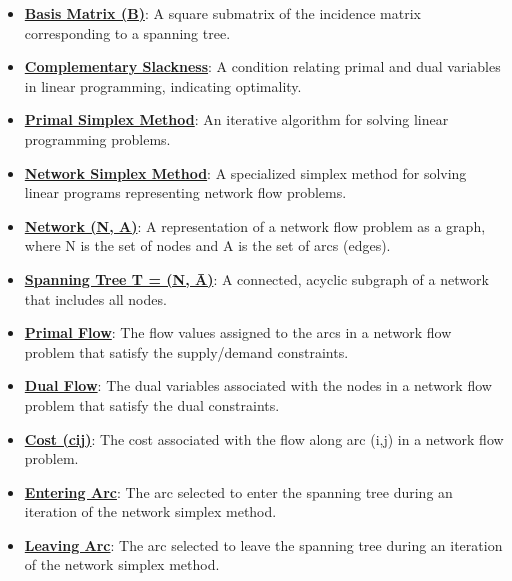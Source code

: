 \documentclass{article}%
\begin{document}
\begin{itemize}[leftmargin=*]
\item \href{https://www.math.purdue.edu/~yipn/421/2024-11-05-NetFlows.pdf#page=15}{\textbf{Basis Matrix (B)}}: A square submatrix of the incidence matrix corresponding to a spanning tree. %
\item \href{https://www.math.purdue.edu/~yipn/421/2024-11-05-NetFlows.pdf#page=18}{\textbf{Complementary Slackness}}: A condition relating primal and dual variables in linear programming, indicating optimality. %
\item \href{https://www.math.purdue.edu/~yipn/421/2024-11-05-NetFlows.pdf#page=22}{\textbf{Primal Simplex Method}}: An iterative algorithm for solving linear programming problems. %
\item \href{https://www.math.purdue.edu/~yipn/421/2024-11-07-NetSimplex.pdf#page=1}{\textbf{Network Simplex Method}}: A specialized simplex method for solving linear programs representing network flow problems. %
\item \href{https://www.math.purdue.edu/~yipn/421/2024-11-07-NetSimplex.pdf#page=1}{\textbf{Network (N, A)}}: A representation of a network flow problem as a graph, where N is the set of nodes and A is the set of arcs (edges). %
\item \href{https://www.math.purdue.edu/~yipn/421/2024-11-07-NetSimplex.pdf#page=1}{\textbf{Spanning Tree T = (N, Ā)}}: A connected, acyclic subgraph of a network that includes all nodes. %
\item \href{https://www.math.purdue.edu/~yipn/421/2024-11-07-NetSimplex.pdf#page=2}{\textbf{Primal Flow}}: The flow values assigned to the arcs in a network flow problem that satisfy the supply/demand constraints. %
\item \href{https://www.math.purdue.edu/~yipn/421/2024-11-07-NetSimplex.pdf#page=3}{\textbf{Dual Flow}}: The dual variables associated with the nodes in a network flow problem that satisfy the dual constraints. %
\item \href{https://www.math.purdue.edu/~yipn/421/2024-11-07-NetSimplex.pdf#page=3}{\textbf{Cost (cij)}}: The cost associated with the flow along arc (i,j) in a network flow problem. %
\item \href{https://www.math.purdue.edu/~yipn/421/2024-11-07-NetSimplex.pdf#page=6}{\textbf{Entering Arc}}: The arc selected to enter the spanning tree during an iteration of the network simplex method. %
\item \href{https://www.math.purdue.edu/~yipn/421/2024-11-07-NetSimplex.pdf#page=6}{\textbf{Leaving Arc}}: The arc selected to leave the spanning tree during an iteration of the network simplex method. %

\end{itemize}
\end{document}

